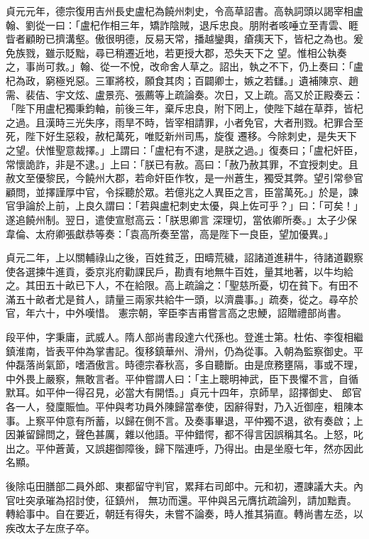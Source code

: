 \begin{pinyinscope}
 貞元元年，德宗復用吉州長史盧杞為饒州刺史，令高草詔書。高執詞頭以謁宰相盧翰、劉從一曰：「盧杞作相三年，矯詐陰賊，退斥忠良。朋附者咳唾立至青雲、睚眥者顧盼已擠溝壑。傲很明德，反易天常，播越鑾輿，瘡痍天下，皆杞之為也。爰免族戮，雖示貶黜，尋已稍遷近地，若更授大郡，恐失天下之
 望。惟相公執奏之，事尚可救。」翰、從一不悅，改命舍人草之。詔出，執之不下，仍上奏曰：「盧杞為政，窮極兇惡。三軍將校，願食其肉；百闢卿士，嫉之若讎。」遺補陳京、趙需、裴佶、宇文炫、盧景亮、張薦等上疏論奏。次日，又上疏。高又於正殿奏云：「陛下用盧杞獨秉鈞軸，前後三年，棄斥忠良，附下罔上，使陛下越在草莽，皆杞之過。且漢時三光失序，雨旱不時，皆宰相請罪，小者免官，大者刑戮。杞罪合至死，陛下好生惡殺，赦杞萬死，唯貶新州司馬，旋復
 遷移。今除刺史，是失天下之望。伏惟聖意裁擇。」上謂曰：「盧杞有不逮，是朕之過。」復奏曰；「盧杞奸臣，常懷詭詐，非是不逮。」上曰：「朕已有赦。高曰：「赦乃赦其罪，不宜授刺史。且赦文至優黎民，今饒州大郡，若命奸臣作牧，是一州蒼生，獨受其弊。望引常參官顧問，並擇謹厚中官，令採聽於眾。若億兆之人異臣之言，臣當萬死。」於是，諫官爭論於上前，上良久謂曰：「若與盧杞刺史太優，與上佐可乎？」曰：「可矣！」遂追饒州制。翌日，遣使宣慰高云：「朕思卿言
 深理切，當依卿所奏。」太子少保韋倫、太府卿張獻恭等奏：「袁高所奏至當，高是陛下一良臣，望加優異。」



 貞元二年，上以關輔祿山之後，百姓貧乏，田疇荒穢，詔諸道進耕牛，待諸道觀察使各選揀牛進貢，委京兆府勸課民戶，勘責有地無牛百姓，量其地著，以牛均給之。其田五十畝已下人，不在給限。高上疏論之：「聖慈所憂，切在貧下。有田不滿五十畝者尤是貧人，請量三兩家共給牛一頭，以濟農事。」疏奏，從之。尋卒於官，年六十，中外嘆惜。
 憲宗朝，宰臣李吉甫嘗言高之忠鯁，詔贈禮部尚書。



 段平仲，字秉庸，武威人。隋人部尚書段達六代孫也。登進士第。杜佑、李復相繼鎮淮南，皆表平仲為掌書記。復移鎮華州、滑州，仍為從事。入朝為監察御史。平仲磊落尚氣節，嗜酒傲言。時德宗春秋高，多自聽斷。由是庶務壅隔，事或不理，中外畏上嚴察，無敢言者。平仲嘗謂人曰：「主上聰明神武，臣下畏懼不言，自循默耳。如平仲一得召見，必當大有開悟。」貞元十四年，京師旱，詔擇御史、
 郎官各一人，發廩賑恤。平仲與考功員外陳歸當奉使，因辭得對，乃入近御座，粗陳本事。上察平仲意有所蓄，以歸在側不言。及奏事畢退，平仲獨不退，欲有奏啟；上因兼留歸問之，聲色甚厲，雜以他語。平仲錯愕，都不得言因誤稱其名。上怒，叱出之。平仲蒼黃，又誤趨御障後，歸下階連呼，乃得出。由是坐廢七年，然亦因此名顯。



 後除屯田膳部二員外郎、東都留守判官，累拜右司郎中。元和初，遷諫議大夫。內官吐突承璀為招討使，征鎮州，
 無功而還。平仲與呂元膺抗疏論列，請加黜責。轉給事中。自在要近，朝廷有得失，未嘗不論奏，時人推其狷直。轉尚書左丞，以疾改太子左庶子卒。




\end{pinyinscope}
